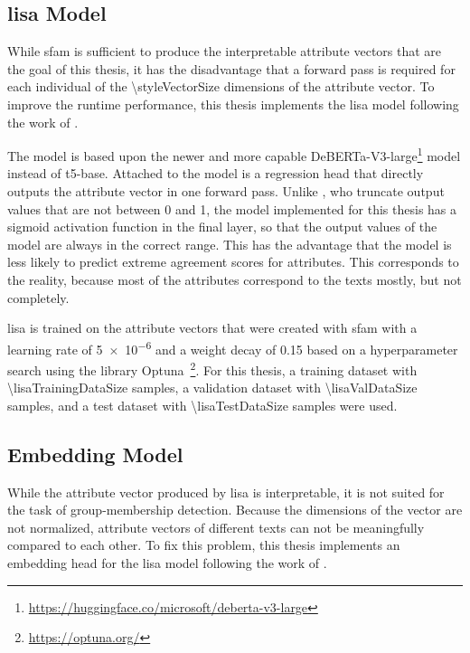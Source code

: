 %     


\subsection{\acf{lisa} Model}
\label{sec:experiments:setup:lisa}
While \ac{sfam} is sufficient to produce the interpretable attribute vectors that are the goal of this thesis, it has the disadvantage that a forward pass is required for each individual of the \num{\styleVectorSize} dimensions of the attribute vector. To improve the runtime performance, this thesis implements the \ac{lisa} model following the work of \citet{patelLearningInterpretableStyle2023}.

The model is based upon the newer and more capable DeBERTa-V3-large\footnote{\url{https://huggingface.co/microsoft/deberta-v3-large}} model instead of t5-base. Attached to the model is a regression head that directly outputs the attribute vector in one forward pass. Unlike \citet{patelLearningInterpretableStyle2023}, who truncate output values that are not between \num{0} and \num{1}, the model implemented for this thesis has a sigmoid activation function in the final layer, so that the output values of the model are always in the correct range. This has the advantage that the model is less likely to predict extreme agreement scores for attributes. This corresponds to the reality, because most of the attributes correspond to the texts mostly, but not completely.

\ac{lisa} is trained on the attribute vectors that were created with \ac{sfam} with a learning rate of \num{5e-6} and a weight decay of \num{0.15} based on a hyperparameter search using the library Optuna~\footnote{\url{https://optuna.org/}}. For this thesis, a training dataset with \num{\lisaTrainingDataSize} samples, a validation dataset with \num{\lisaValDataSize} samples, and a test dataset with \num{\lisaTestDataSize} samples were used.


\subsection{Embedding Model}
\label{sec:experiments:setup:embedder}
While the attribute vector produced by \ac{lisa} is interpretable, it is not suited for the task of group-membership detection. Because the dimensions of the vector are not normalized, attribute vectors of different texts can not be meaningfully compared to each other. To fix this problem, this thesis implements an embedding head for the \ac{lisa} model following the work of \citet{patelLearningInterpretableStyle2023}.

